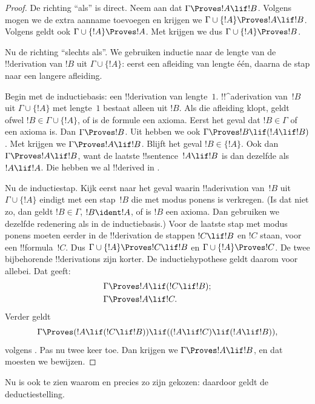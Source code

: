 \documentclass[openany]{memoir}
\begin{document}
\begin{proof}
De richting ``als'' is direct. Neem aan dat $\Gamma \Proves !A \lif
!B$. Volgens  mogen we de extra aanname
toevoegen en krijgen we $\Gamma \cup \{!A\} \Proves !A \lif !B$.
Volgens  geldt ook $\Gamma \cup \{!A\}
\Proves !A$. Met  krijgen we dus $\Gamma \cup \{!A\}
\Proves !B$.

Nu de richting ``slechts als''. We gebruiken inductie naar de lengte
van de !!{derivation} van $!B$ uit $\Gamma \cup \{!A\}$: eerst een
afleiding van lengte één, daarna de stap naar een langere afleiding.

Begin met de inductiebasis: een !!{derivation} van lengte~$1$.
!!^a{derivation} van~$!B$ uit $\Gamma \cup \{!A\}$ met lengte~$1$
bestaat alleen uit $!B$. Als die afleiding klopt, geldt ofwel
$!B$$\in \Gamma \cup \{!A\}$, of is de formule een axioma. Eerst het
geval dat $!B \in \Gamma$ of een axioma is. Dan $\Gamma \Proves !B$.
Uit  hebben we ook $\Gamma \Proves !B \lif (!A
\lif !B)$. Met  krijgen we $\Gamma \Proves !A \lif !B$.
Blijft het geval $!B \in \{ !A\}$. Ook dan $\Gamma \Proves !A \lif
!B$, want de laatste !!{sentence}~$!A \lif !B$ is dan dezelfde als
$!A \lif !A$. Die hebben we al !!{derive}d in
.

Nu de inductiestap. Kijk eerst naar het geval waarin !!a{derivation}
van~$!B$ uit $\Gamma \cup \{!A\}$ eindigt met een stap~$!B$ die met
modus ponens is verkregen. (Is dat niet zo, dan geldt $!B \in \Gamma$,
$!B \ident !A$, of is $!B$ een axioma. Dan gebruiken we dezelfde
redenering als in de inductiebasis.) Voor de laatste stap met modus
ponens moeten eerder in de !!{derivation} de stappen $!C \lif !B$ en
$!C$ staan, voor een !!{formula}~$!C$. Dus $\Gamma \cup \{!A\}
\Proves !C \lif !B$ en $\Gamma \cup \{!A\} \Proves !C$. De twee
bijbehorende !!{derivation}s zijn korter. De inductiehypothese geldt
daarom voor allebei. Dat geeft:
\begin{align*}
  & \Gamma \Proves !A \lif (!C \lif !B); \\
  & \Gamma \Proves !A \lif !C.
\end{align*}
Verder geldt
\[
\Gamma \Proves (!A \lif (!C \lif !B)) \lif
((!A\lif !C)  \lif (!A \lif !B)),
\]
volgens . Pas  nu twee keer toe. Dan
krijgen we $\Gamma \Proves !A \lif !B$, en dat moesten we bewijzen.
\end{proof}

Nu is ook te zien waarom  en
 precies zo zijn gekozen: daardoor geldt de
deductiestelling.
\end{document}
